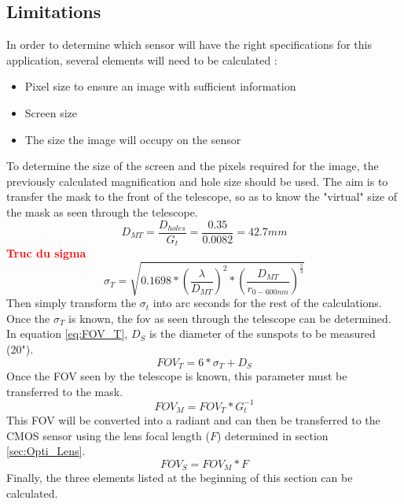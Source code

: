 \subsection{Limitations}
In order to determine which sensor will have the right specifications for this application,
several elements will need to be calculated :
\begin{itemize}
    \item Pixel size to ensure an image with sufficient information
    \item Screen size
    \item The size the image will occupy on the sensor
\end{itemize}
\bigbreak
To determine the size of the screen and the pixels required for the image, the previously
calculated magnification and hole size should be used.
The aim is to transfer the mask to the front of the telescope, so as to know the "virtual" size of the mask as
seen through the telescope.
\begin{equation}\label{eq:DMT}
    D_{MT} = \frac{D_{holes}}{G_t} = \frac{0.35}{0.0082} = 42.7mm
\end{equation}
\textbf{\textcolor{red}{Truc du sigma}}
\begin{equation}
    \sigma_T = \sqrt{0.1698*\left(\frac{\lambda}{D_{MT}}\right)^2*\left(\frac{D_{MT}}{r_{0-600nm}}\right)^{\frac{5}{3}}}
\end{equation}
Then simply transform the $\sigma_t$ into arc seconds for the rest of the calculations.
\newline
Once the $\sigma_T$ is known, the fov as seen through the telescope can be determined. In equation \ref{eq:FOV_T}, $D_S$ is the diameter
of the sunspots to be measured (20").
\begin{equation}\label{eq:FOV_T}
    FOV_T = 6 * \sigma_T + D_S
\end{equation}
Once the FOV seen by the telescope is known, this parameter must be transferred to the mask.
\begin{equation}
    FOV_M = FOV_T * G_t^{-1}
\end{equation}
This FOV will be converted into a radiant and can then be transferred to the CMOS sensor
using the lens focal length ($F$) determined in section \ref{sec:Opti_Lens}.
\begin{equation}
    FOV_S = FOV_M * F
\end{equation}
Finally, the three elements listed at the beginning of this section can be calculated.
